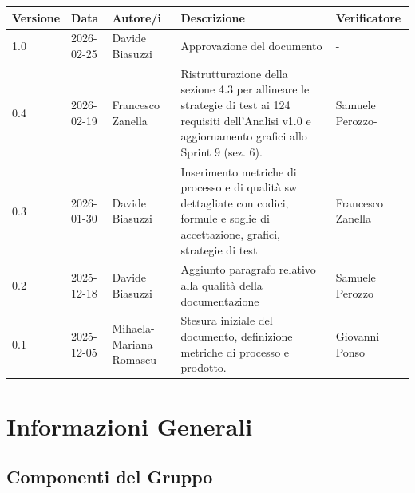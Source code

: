\documentclass[a4paper,11pt,oneside]{scrartcl}
\begin{document}
\begin{center}
\renewcommand{\arraystretch}{1.5}
\begin{tabularx}{\textwidth}{@{}p{}p{}p{}X>{\centering\arraybackslash}p{}@{}}
\toprule
\textbf{Versione} & \textbf{Data} & \textbf{Autore/i} & \textbf{Descrizione} & \textbf{Verificatore} \\
\midrule
1.0 & 2026-02-25 & Davide Biasuzzi & Approvazione del documento & -\\
0.4 & 2026-02-19 & Francesco Zanella & Ristrutturazione della sezione 4.3 per allineare le strategie di test ai 124 requisiti dell'Analisi v1.0 e aggiornamento grafici allo Sprint 9 (sez. 6). & Samuele Perozzo-\\
0.3 & 2026-01-30 & Davide Biasuzzi & Inserimento metriche di processo e di qualità sw dettagliate con codici, formule e soglie di accettazione, grafici, strategie di test & Francesco Zanella\\
0.2 & 2025-12-18 & Davide Biasuzzi & Aggiunto paragrafo relativo alla qualità della documentazione & Samuele Perozzo\\
0.1 & 2025-12-05 & Mihaela-Mariana Romascu & Stesura iniziale del documento, definizione metriche di processo e prodotto. & Giovanni Ponso\\
\bottomrule
\end{tabularx}
\end{center}

\newpage
\tableofcontents
\newpage

\section*{Informazioni Generali}

\subsection*{Componenti del Gruppo}
\end{document}
